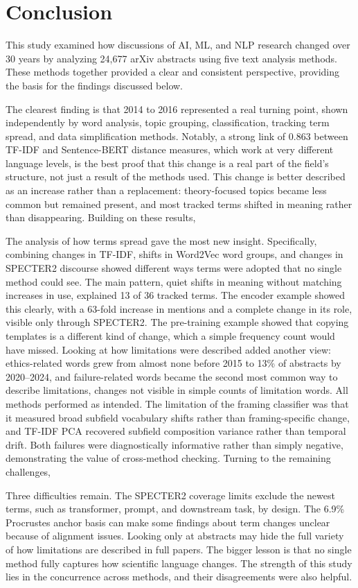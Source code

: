 \section{Conclusion}

This study examined how discussions of AI, ML, and NLP research changed over 30 years by analyzing 24,677 arXiv abstracts using five text analysis methods. These methods together provided a clear and consistent perspective, providing the basis for the findings discussed below.

The clearest finding is that 2014 to 2016 represented a real turning point, shown independently by word analysis, topic grouping, classification, tracking term spread, and data simplification methods. Notably, a strong link of 0.863 between TF-IDF and Sentence-BERT distance measures, which work at very different language levels, is the best proof that this change is a real part of the field’s structure, not just a result of the methods used. This change is better described as an increase rather than a replacement: theory-focused topics became less common but remained present, and most tracked terms shifted in meaning rather than disappearing. Building on these results,

The analysis of how terms spread gave the most new insight. Specifically, combining changes in TF-IDF, shifts in Word2Vec word groups, and changes in SPECTER2 discourse showed different ways terms were adopted that no single method could see. The main pattern, quiet shifts in meaning without matching increases in use, explained 13 of 36 tracked terms. The encoder example showed this clearly, with a 63-fold increase in mentions and a complete change in its role, visible only through SPECTER2. The pre-training example showed that copying templates is a different kind of change, which a simple frequency count would have missed. Looking at how limitations were described added another view: ethics-related words grew from almost none before 2015 to 13\% of abstracts by 2020–2024, and failure-related words became the second most common way to describe limitations, changes not visible in simple counts of limitation words. All methods performed as intended. The limitation of the framing classifier was that it measured broad subfield vocabulary shifts rather than framing-specific change, and TF-IDF PCA recovered subfield composition variance rather than temporal drift. Both failures were diagnostically informative rather than simply negative, demonstrating the value of cross-method checking. Turning to the remaining challenges,

Three difficulties remain. The SPECTER2 coverage limits exclude the newest terms, such as transformer, prompt, and downstream task, by design. The 6.9\% Procrustes anchor basis can make some findings about term changes unclear because of alignment issues. Looking only at abstracts may hide the full variety of how limitations are described in full papers. The bigger lesson is that no single method fully captures how scientific language changes. The strength of this study lies in the concurrence across methods, and their disagreements were also helpful.